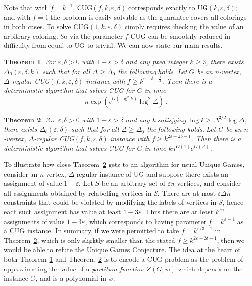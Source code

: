 \documentclass[10pt,a4paper]{article}
\newtheorem{theorem}{Theorem}
\theoremstyle{definition}
\newcommand*{\eps}{\varepsilon}
\newcommand*{\UG}[1][]{UG$(#1)$}
\newcommand*{\CUG}[1][]{CUG$(#1)$}
\begin{document}
%
Note that with $f=k^{-1}$, \CUG[f,k,\eps,\delta] corresponds exactly to \UG[k,\eps,\delta]; and with $f=1$ the problem is easily solvable as the guarantee covers all colorings in both cases. To solve \CUG[1,k,\eps,\delta] simply requires checking the value of an arbitrary coloring.
So via the parameter $f$ CUG can be smoothly reduced in difficulty from equal to UG to trivial. We can now state our main results.
%

\begin{theorem}\label{thm:main,interp}
For $\eps,\delta>0$ with $1-\eps > \delta$ and any fixed integer $k\ge 3$, there exists $\Delta_0(\eps,\delta,k)$ such that for all $\Delta\ge\Delta_0$ the following holds. 
%
Let $G$ be an $n$-vertex, $\Delta$-regular \CUG[f,k,\eps,\delta] instance with $f \ge k^{\eps+\delta-\frac{1}{2}}$.  
Then there is a deterministic algorithm that solves CUG for $G$ in time
\[
n\exp\left(e^{O(\log^2 k)} \log^2\Delta\right)\,.
\]
\end{theorem}
%
\begin{theorem}\label{thm:main,cluster}
For $\eps,\delta>0$ with $1-\eps > \delta$ and any $k$ satisfying $\log k\ge \Delta^{3/2}\log\Delta$, there exists $\Delta_0(\eps,\delta)$ such that for all $\Delta\ge\Delta_0$ the following holds. 
%
Let $G$ be an $n$-vertex, $\Delta$-regular \CUG[f,k,\eps,\delta] instance with $f\ge k^{2\eps+2\delta-1}$.
Then there is a deterministic algorithm that solves CUG for $G$ in time $kn^{O(1)}e^{O(\Delta)}$.
\end{theorem}
%
To illustrate how close Theorem~\ref{thm:main,cluster} gets to an algorithm for usual Unique Games, consider an $n$-vertex, $\Delta$-regular instance of UG and suppose there exists an assignment of value $1-\eps$. 
Let $S$ be an arbitrary set of $\eps n$ vertices, and consider all assignments obtained by relabelling vertices in $S$. 
There are at most $\eps\Delta n$ constraints that could be violated by modifying the labels of vertices in $S$, hence each such assignment has value at least $1-3\eps$.
Thus there are at least $k^{\eps n}$ assignments of value $1-3\eps$, which corresponds to having parameter $f=k^{\eps-1}$ as a CUG instance. 
In summary, if we were permitted to take $f=k^{\eps/3-1}$ in Theorem~\ref{thm:main,cluster}, which is only slightly smaller than the stated $f\ge k^{2\eps+2\delta-1}$, then we would be able to refute the Unique Games Conjecture.
%
The idea at the heart of both Theorem~\ref{thm:main,interp} and Theorem~\ref{thm:main,cluster} is to encode a CUG problem as the problem of approximating the value of a \emph{partition function} $Z(G;w)$ which depends on the instance $G$, and is a polynomial in $w$. 
\end{document}
